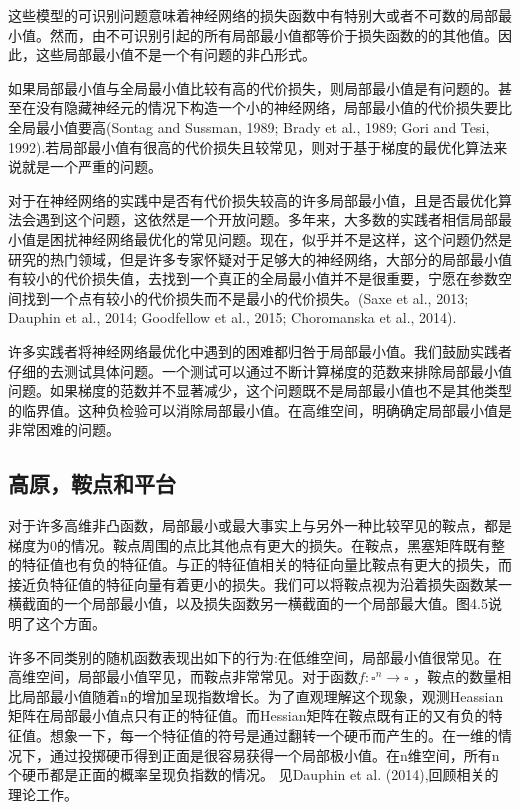 这些模型的可识别问题意味着神经网络的损失函数中有特别大或者不可数的局部最小值。然而，由不可识别引起的所有局部最小值都等价于损失函数的的其他值。因此，这些局部最小值不是一个有问题的非凸形式。

如果局部最小值与全局最小值比较有高的代价损失，则局部最小值是有问题的。甚至在没有隐藏神经元的情况下构造一个小的神经网络，局部最小值的代价损失要比全局最小值要高(Sontag and Sussman, 1989; Brady et al., 1989; Gori and Tesi, 1992).若局部最小值有很高的代价损失且较常见，则对于基于梯度的最优化算法来说就是一个严重的问题。

对于在神经网络的实践中是否有代价损失较高的许多局部最小值，且是否最优化算法会遇到这个问题，这依然是一个开放问题。多年来，大多数的实践者相信局部最小值是困扰神经网络最优化的常见问题。现在，似乎并不是这样，这个问题仍然是研究的热门领域，但是许多专家怀疑对于足够大的神经网络，大部分的局部最小值有较小的代价损失值，去找到一个真正的全局最小值并不是很重要，宁愿在参数空间找到一个点有较小的代价损失而不是最小的代价损失。(Saxe et al., 2013; Dauphin et al., 2014; Goodfellow et al., 2015; Choromanska et al., 2014).

许多实践者将神经网络最优化中遇到的困难都归咎于局部最小值。我们鼓励实践者仔细的去测试具体问题。一个测试可以通过不断计算梯度的范数来排除局部最小值问题。如果梯度的范数并不显著减少，这个问题既不是局部最小值也不是其他类型的临界值。这种负检验可以消除局部最小值。在高维空间，明确确定局部最小值是非常困难的问题。

\subsection{高原，鞍点和平台}

对于许多高维非凸函数，局部最小或最大事实上与另外一种比较罕见的鞍点，都是梯度为0的情况。鞍点周围的点比其他点有更大的损失。在鞍点，黑塞矩阵既有整的特征值也有负的特征值。与正的特征值相关的特征向量比鞍点有更大的损失，而接近负特征值的特征向量有着更小的损失。我们可以将鞍点视为沿着损失函数某一横截面的一个局部最小值，以及损失函数另一横截面的一个局部最大值。图4.5说明了这个方面。

许多不同类别的随机函数表现出如下的行为:在低维空间，局部最小值很常见。在高维空间，局部最小值罕见，而鞍点非常常见。对于函数$f:\square^n\to \square$ ，鞍点的数量相比局部最小值随着n的增加呈现指数增长。为了直观理解这个现象，观测Heassian矩阵在局部最小值点只有正的特征值。而Hessian矩阵在鞍点既有正的又有负的特征值。想象一下，每一个特征值的符号是通过翻转一个硬币而产生的。在一维的情况下，通过投掷硬币得到正面是很容易获得一个局部极小值。在n维空间，所有n个硬币都是正面的概率呈现负指数的情况。
见Dauphin et al. (2014),回顾相关的理论工作。

